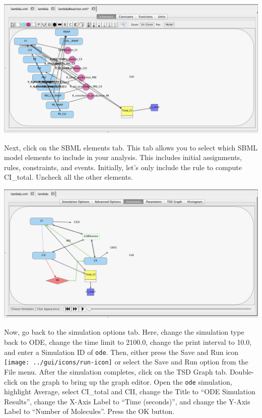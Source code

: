 \documentclass[titlepage,11pt]{article}
\begin{document}
\begin{center}
\includegraphics[width=160mm]{screenshots/reactionModel}
\end{center}

Next, click on the SBML elements tab.  This tab allows you to select which SBML model elements to include in your analysis.  This includes initial assignments, rules, constraints, and events.  Initially, let's only include the rule to compute CI\_total.  Uncheck all the other elements.

\begin{center}
\includegraphics[width=160mm]{screenshots/SBMLElements}
\end{center}

Now, go back to the simulation options tab.  Here, change the simulation type back to ODE, change the time limit to 2100.0, change the print interval to 10.0, and enter a Simulation ID of {\tt ode}.  Then, either press the Save and Run icon \texttt{[image: ../gui/icons/run-icon]} or select the Save and Run option from the File menu.
After the simulation completes, click on the TSD Graph tab.  Double-click on the graph to bring up the graph editor.
Open the {\tt ode} simulation, highlight Average, select CI\_total and CII, change the Title to ``ODE Simulation Results'', change the X-Axis Label to ``Time (seconds)'', and change the Y-Axis Label to ``Number of Molecules''.  
Press the OK button.  
\end{document}
